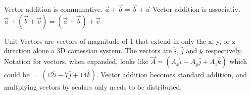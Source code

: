 \documentclass{article}
\begin{document}
\noindent
Vector addition is communative. $\vec{a} + \vec{b} = \vec{b} + \vec{a}$
Vector addition is associativ. $\vec{a} + (\vec{b} + \vec{c}) = (\vec{a} + \vec{b}) + \vec{c}$

\indent
Unit Vectors are vectors of magnitude of 1 that extend in only the x, y, or z direction alone a 3D cartessian system. The vectors are $\hat{i}$, $\hat{j}$ and $\hat{k}$ respectively. Notation for vectors, when expanded, looks like $\vec{A} = (A_x\hat{i} - A_y\hat{j} + A_z\hat{k})$ which could be $=(12\hat{i} - 7\hat{j} + 14\hat{k})$. Vector addition becomes standard addition, and multplying vectors by scalars only needs to be distributed.
\end{document}
